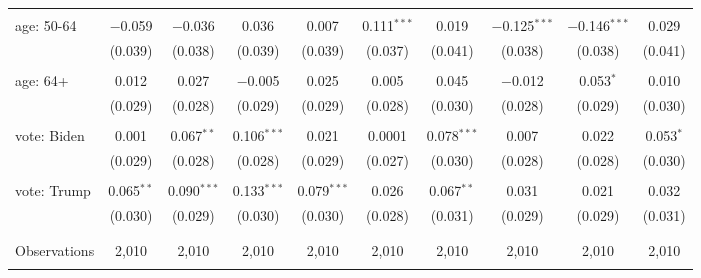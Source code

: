 \begin{tabular}{@{\extracolsep{5pt}}lccccccccc}
  & & & & & & & & & \\ 
 age: 50-64 & $-$0.059 & $-$0.036 & 0.036 & 0.007 & 0.111$^{***}$ & 0.019 & $-$0.125$^{***}$ & $-$0.146$^{***}$ & 0.029 \\ 
  & (0.039) & (0.038) & (0.039) & (0.039) & (0.037) & (0.041) & (0.038) & (0.038) & (0.041) \\ 
  & & & & & & & & & \\ 
 age: 64+ & 0.012 & 0.027 & $-$0.005 & 0.025 & 0.005 & 0.045 & $-$0.012 & 0.053$^{*}$ & 0.010 \\ 
  & (0.029) & (0.028) & (0.029) & (0.029) & (0.028) & (0.030) & (0.028) & (0.029) & (0.030) \\ 
  & & & & & & & & & \\ 
 vote: Biden & 0.001 & 0.067$^{**}$ & 0.106$^{***}$ & 0.021 & 0.0001 & 0.078$^{***}$ & 0.007 & 0.022 & 0.053$^{*}$ \\ 
  & (0.029) & (0.028) & (0.028) & (0.029) & (0.027) & (0.030) & (0.028) & (0.028) & (0.030) \\ 
  & & & & & & & & & \\ 
 vote: Trump & 0.065$^{**}$ & 0.090$^{***}$ & 0.133$^{***}$ & 0.079$^{***}$ & 0.026 & 0.067$^{**}$ & 0.031 & 0.021 & 0.032 \\ 
  & (0.030) & (0.029) & (0.030) & (0.030) & (0.028) & (0.031) & (0.029) & (0.029) & (0.031) \\ 
  & & & & & & & & & \\ 
\hline \\[-1.8ex] 

Observations & 2,010 & 2,010 & 2,010 & 2,010 & 2,010 & 2,010 & 2,010 & 2,010 & 2,010 \\ 
\hline 
\hline \\[-1.8ex] 
\end{tabular} 